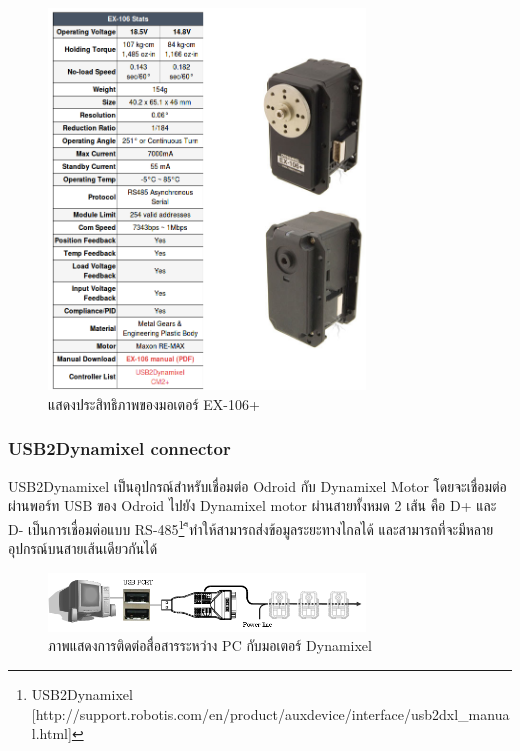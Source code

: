 \begin{figure}[!ht]
    \centering
    \includegraphics[width=0.75\textwidth]{chapter3/images/dxl_ex106.png}
    \caption{แสดงประสิทธิภาพของมอเตอร์ EX-106+}
    \label{fig:dxl_ex106}
\end{figure}


\clearpage
\subsubsection*{USB2Dynamixel connector}
USB2Dynamixel เป็นอุปกรณ์สำหรับเชื่อมต่อ Odroid กับ Dynamixel Motor
โดยจะเชื่อมต่อผ่านพอร์ท USB ของ Odroid ไปยัง Dynamixel motor
ผ่านสายทั้งหมด 2 เส้น คือ D+ และ D-
เป็นการเชื่อมต่อแบบ RS-485\footnote{USB2Dynamixel [http://support.robotis.com/en/product/auxdevice/interface/usb2dxl\_manual.html]}
ืทำให้สามารถส่งข้อมูลระยะทางไกลได้ และสามารถที่จะมีหลายอุปกรณ์บนสายเส้นเดียวกันได้

\begin{figure}[!ht]
    \centering
    \includegraphics[width=0.75\textwidth]{chapter3/images/dynamixel2pc.png}
    \caption{ภาพแสดงการติดต่อสื่อสารระหว่าง PC กับมอเตอร์ Dynamixel}
    \label{fig:dynamixel2pc}
\end{figure}

